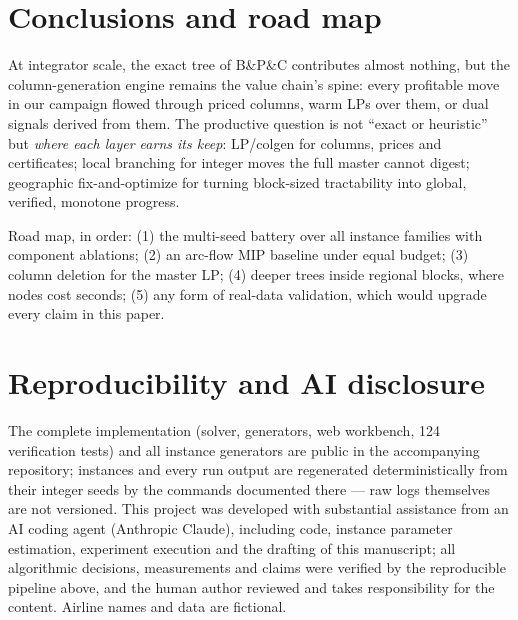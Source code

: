 \documentclass[11pt]{article}
\begin{document}
\section{Conclusions and road map}\label{sec:conclusions}

At integrator scale, the exact tree of B\&P\&C contributes almost nothing,
but the column-generation engine remains the value chain's spine: every
profitable move in our campaign flowed through priced columns, warm LPs
over them, or dual signals derived from them. The productive question is
not ``exact or heuristic'' but \emph{where each layer earns its keep}:
LP/colgen for columns, prices and certificates; local branching for
integer moves the full master cannot digest; geographic fix-and-optimize
for turning block-sized tractability into global, verified, monotone
progress.

Road map, in order: (1) the multi-seed battery over all instance families
with component ablations; (2) an arc-flow MIP baseline under equal budget;
(3) column deletion for the master LP; (4) deeper trees inside regional
blocks, where nodes cost seconds; (5) any form of real-data validation,
which would upgrade every claim in this paper.

\section*{Reproducibility and AI disclosure}

The complete implementation (solver, generators, web workbench, 124
verification tests) and all instance generators are public in the
accompanying repository; instances and every run output are regenerated
deterministically from their integer seeds by the commands documented
there --- raw logs themselves are not versioned. This project was developed with substantial
assistance from an AI coding agent (Anthropic Claude), including code,
instance parameter estimation, experiment execution and the drafting of
this manuscript; all algorithmic decisions, measurements and claims were
verified by the reproducible pipeline above, and the human author reviewed
and takes responsibility for the content. Airline names and data are
fictional.
\end{document}
